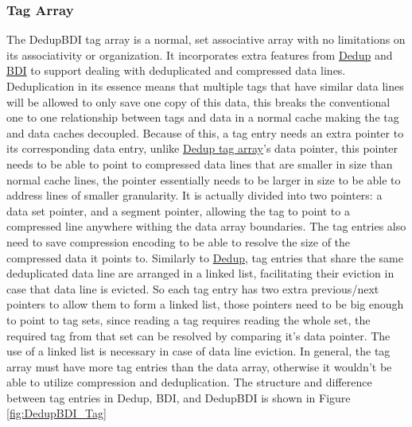\subsubsection{Tag Array}
\label{sssec:DedupBDITag}
The DedupBDI tag array is a normal, set associative array with no limitations on its associativity or organization. It incorporates extra features from \hyperref[sssec:DedupTag]{Dedup} and \hyperref[sssec:BDITag]{BDI} to support dealing with deduplicated and compressed data lines. Deduplication in its essence means that multiple tags that have similar data lines will be allowed to only save one copy of this data, this breaks the conventional one to one relationship between tags and data in a normal cache making the tag and data caches decoupled. Because of this, a tag entry needs an extra pointer to its corresponding data entry, unlike \hyperref[sssec:DedupTag]{Dedup tag array}'s data pointer, this pointer needs to be able to point to compressed data lines that are smaller in size than normal cache lines, the pointer essentially needs to be larger in size to be able to address lines of smaller granularity. It is actually divided into two pointers: a data set pointer, and a segment pointer, allowing the tag to point to a compressed line anywhere withing the data array boundaries. The tag entries also need to save compression encoding to be able to resolve the size of the compressed data it points to. Similarly to \hyperref[sssec:DedupTag]{Dedup}, tag entries that share the same deduplicated data line are arranged in a linked list, facilitating their eviction in case that data line is evicted. So each tag entry has two extra previous/next pointers to allow them to form a linked list, those pointers need to be big enough to point to tag sets, since reading a tag requires reading the whole set, the required tag from that set can be resolved by comparing it's data pointer. The use of a linked list is necessary in case of data line eviction. In general, the tag array must have more tag entries than the data array, otherwise it wouldn't be able to utilize compression and deduplication. The structure and difference between tag entries in Dedup, BDI, and DedupBDI is shown in Figure \ref{fig:DedupBDI_Tag}
